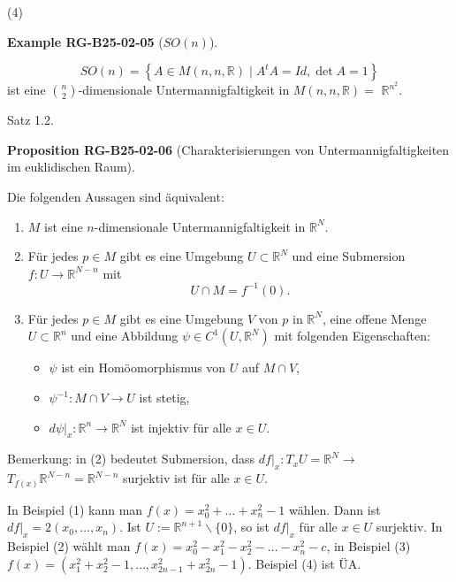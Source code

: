 \documentclass[10pt, letterpaper]{article}
\newcommand{\CustomHeading}[3]{%
  \par\medskip\noindent%
  \textbf{#1 #2} \textnormal{(#3)}.\enskip%
}
\newenvironment{PROP}[2]{\begin{unitbox}\CustomHeading{Proposition}{#1}{#2}}{\end{unitbox}}
\newenvironment{EXA}[2]{\begin{unitbox}\CustomHeading{Example}{#1}{#2}}{\end{unitbox}}
\begin{document}
(4)

\begin{EXA}{RG-B25-02-05}{$SO(n)$}
$$
S O(n)=\left\{A \in M(n, n, \mathbb{R}) \mid A^{t} A=I d, \operatorname{det} A=1\right\}
$$
ist eine $\binom{n}{2}$-dimensionale Untermannigfaltigkeit in $M(n, n, \mathbb{R})=$ $\mathbb{R}^{n^{2}}$.
\end{EXA}



Satz 1.2. 

\begin{PROP}{RG-B25-02-06}{Charakterisierungen von Untermannigfaltigkeiten im euklidischen Raum}
Die folgenden Aussagen sind äquivalent:
\begin{enumerate}
    \item $M$ ist eine $n$-dimensionale Untermannigfaltigkeit in $\mathbb{R}^{N}$.
    
    \item Für jedes $p \in M$ gibt es eine Umgebung $U \subset \mathbb{R}^{N}$ und eine Submersion $f: U \rightarrow \mathbb{R}^{N-n}$ mit
    \[
    U \cap M = f^{-1}(0).
    \]

    \item Für jedes $p \in M$ gibt es eine Umgebung $V$ von $p$ in $\mathbb{R}^{N}$, eine offene Menge $U \subset \mathbb{R}^{n}$ und eine Abbildung $\psi \in C^{1}\left(U, \mathbb{R}^{N}\right)$ mit folgenden Eigenschaften:
    \begin{itemize}
        \item $\psi$ ist ein Homöomorphismus von $U$ auf $M \cap V$,
        \item $\psi^{-1}: M \cap V \rightarrow U$ ist stetig,
        \item $\left.d\psi\right|_{x}: \mathbb{R}^{n} \rightarrow \mathbb{R}^{N}$ ist injektiv für alle $x \in U$.
    \end{itemize}
\end{enumerate}
\end{PROP}


Bemerkung: in (2) bedeutet Submersion, dass $\left.d f\right|_{x}: T_{x} U=\mathbb{R}^{N} \rightarrow$ $T_{f(x)} \mathbb{R}^{N-n}=\mathbb{R}^{N-n}$ surjektiv ist für alle $x \in U$.

In Beispiel (1) kann man $f(x)=x_{0}^{2}+\ldots+x_{n}^{2}-1$ wählen. Dann ist $\left.d f\right|_{x}=2\left(x_{0}, \ldots, x_{n}\right)$. Ist $U:=\mathbb{R}^{n+1} \backslash\{0\}$, so ist $\left.d f\right|_{x}$ für alle $x \in U$ surjektiv. In Beispiel (2) wählt man $f(x)=x_{0}^{2}-x_{1}^{2}-x_{2}^{2}-\ldots-x_{n}^{2}-c$, in Beispiel (3) $f(x)=\left(x_{1}^{2}+x_{2}^{2}-1, \ldots, x_{2 n-1}^{2}+x_{2 n}^{2}-1\right)$. Beispiel (4) ist ÜA.
\end{document}
